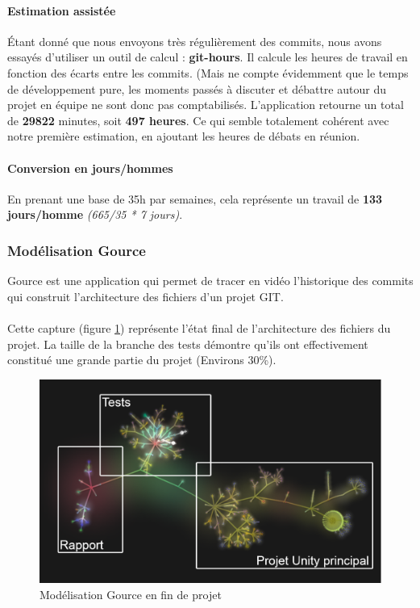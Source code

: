 \paragraph{Estimation assistée}
Étant donné que nous envoyons très régulièrement des commits, nous avons essayés d'utiliser un outil de calcul :  \textbf{git-hours}. Il calcule les heures de travail en fonction des écarts entre les commits. (Mais ne compte évidemment que le temps de développement pure, les moments passés à discuter et débattre autour du projet en équipe ne sont donc pas comptabilisés. L'application retourne un total de \textbf{29822} minutes, soit \textbf{497 heures}. Ce qui semble totalement cohérent avec notre première estimation, en ajoutant les heures de débats en réunion.

\paragraph{Conversion en jours/hommes}
En prenant une base de 35h par semaines, cela représente un travail de \textbf{133 jours/homme} \textit{(665/35 * 7 jours)}.

\subsubsection{Modélisation Gource}

Gource est une application qui permet de tracer en vidéo l’historique des commits qui construit l’architecture des fichiers d’un projet GIT.

\paragraph{}
Cette capture (figure \ref{gource_over}) représente l’état final de l’architecture des fichiers du projet. La taille de la branche des tests démontre qu'ils ont effectivement constitué une grande partie du projet (Environs 30\%).

\begin{figure}[H]\centering
  \includegraphics[scale=.3]{./img/gource_over.png}
  \caption{Modélisation Gource en fin de projet}
  \label{gource_over}
\end{figure}


